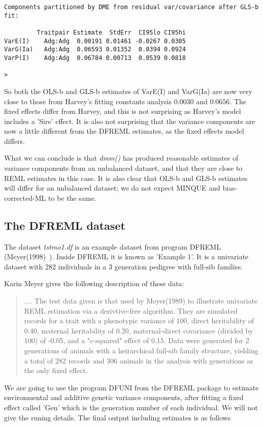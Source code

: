\documentclass[titlepage]{article}  %
\begin{document}
\begin{verbatim}
Components partitioned by DME from residual var/covariance after GLS-b fit:

         Traitpair Estimate  StdErr  CI95lo CI95hi
VarE(I)    Adg:Adg  0.00191 0.01461 -0.0267 0.0305
VarG(Ia)   Adg:Adg  0.06593 0.01352  0.0394 0.0924
VarP(I)    Adg:Adg  0.06784 0.00713  0.0539 0.0818

> 
\end{verbatim}

 So both the OLS-b and GLS-b estimates of VarE(I) and VarG(Ia) are now very close to those from Harvey's fitting constants analysis  $0.0030$ and $0.0656$. The fixed effects differ from Harvey, and this is not surprising as Harvey's model includes a 'Sire' effect. It is also not surprising that the variance components are now a little different from the DFREML estimates, as the fixed effects model differs.

What we can conclude is that {\em dmm()} has produced reasonable estimates of variance components from an unbalanced dataset, and that they are close to REML estimates in this case. It is also clear that OLS-b and GLS-b estimates will differ for an unbalanced dataset; we do not expect MINQUE and bias-corrected-ML to be the same.


\clearpage
\subsection{The DFREML dataset} 
The dataset {\em tstmo1.df} is an example dataset from program DFREML (Meyer(1998)~\cite{meye:98}). Inside DFREML it is known as 'Example 1'. It is a univariate dataset with 282 individuals in a 3 generation pedigree with full-sib families.

Karin Meyer gives the following description of these data:

\begin{quotation}
.... The test data given is that used by Meyer(1989) to illustrate univariate REML estimation via a derivtive-free algorithm. They are simulated records for a trait with a phenotypic variance of 100, direct heritability of 0.40, maternal heritability of 0.20, maternal-direct covariance (divided by 100) of -0.05, and a "c-squared" effect of 0.15. Data were generated for 2 generations of animals with a heirarchical full-sib family structure, yielding a total of 282 records and 306 animals in the analysis with generations as the only fixed effect.
\end{quotation}

We are going to use the program DFUNI from the DFREML package to estimate environmental and additive genetic variance components, after fitting a fixed effect called 'Gen' which is the generation number of each individual. We will not give the runing details. The final output including estimates is as follows
\end{document}
